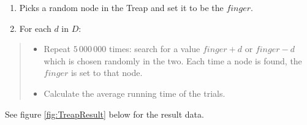 \documentclass[12pt,english,]{article}
\providecommand{\tightlist}{%
  \setlength{\itemsep}{0pt}\setlength{\parskip}{0pt}}
\begin{document}
\begin{enumerate}
\def\labelenumi{\arabic{enumi}.}
\tightlist
\item
  Picks a random node in the Treap and set it to be the \(finger\).
\item
  For each \(d\) in \(D\): \vspace{-4mm}
\end{enumerate}

\begin{quote}
\begin{itemize}
\tightlist
\item
  Repeat \(5\,000\,000\) times: search for a value \(finger + d\) or
  \(finger - d\) which is chosen randomly in the two. Each time a node
  is found, the \(finger\) is set to that node.
\item
  Calculate the average running time of the trials.
\end{itemize}
\end{quote}

See figure \ref{fig:TreapResult} below for the result data.
\end{document}
